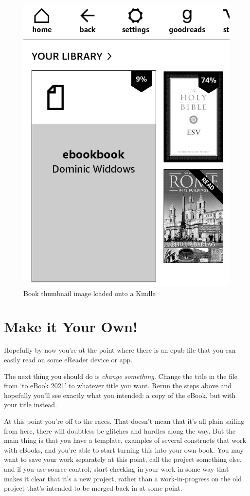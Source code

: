 \begin{figure}
  \begin{center}
  \vspace{0.2cm}
  \includegraphics[width=0.6\linewidth]{images/kindle_screenshot.png}
  \caption{Book thumbnail image loaded onto a Kindle}
  \label{fig:kindle_screenshot}
  \vspace{0.4cm}
 \end{center}
\end{figure}

\section{Make it Your Own!}

Hopefully by now you're at the point where there is an epub file that you can easily read on some eReader device or app. 

The next thing you should do is {\em change something}. Change the title in the  file from `\latex to eBook 2021'
to whatever title you want. Rerun the steps above and hopefully you'll see exactly what you intended: a copy of the eBook, but with
your title instead.

At this point you're off to the races. That doesn't mean that it's all plain sailing from here, there will doubtless be glitches and hurdles along the way.
But the main thing is that you have a template, examples of several \latex constructs that work with eBooks, and you're able to start turning this
into your own book. You may want to save your work separately at this point, call the project something else, and if you use source control,
start checking in your work in some way that makes it clear that it's a new project, rather than a work-in-progress on the old project that's intended to be
merged back in at some point.

